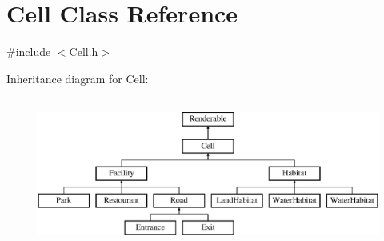 \hypertarget{classCell}{\section{Cell Class Reference}
\label{classCell}
}


{\ttfamily \#include $<$Cell.\-h$>$}

Inheritance diagram for Cell\-:\begin{figure}[H]
\begin{center}
\leavevmode
\includegraphics[height=5.000000cm]{classCell}
\end{center}
\end{figure}
